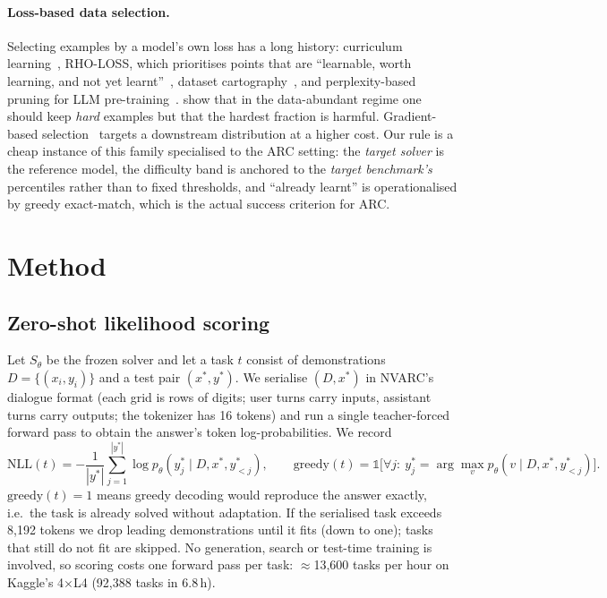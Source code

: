 \documentclass[11pt]{article}
\newcommand{\nvarc}{NVARC}
\begin{document}
\paragraph{Loss-based data selection.}
Selecting examples by a model's own loss has a long history: curriculum learning~\citep{bengio2009curriculum}, RHO-LOSS, which prioritises points that are ``learnable, worth learning, and not yet learnt''~\citep{mindermann2022rholoss}, dataset cartography~\citep{swayamdipta2020cartography}, and perplexity-based pruning for LLM pre-training~\citep{marion2023lessismore,ankner2024perplexed}. \citet{sorscher2022beyond} show that in the data-abundant regime one should keep \emph{hard} examples but that the hardest fraction is harmful. Gradient-based selection~\citep{xia2024less} targets a downstream distribution at a higher cost. Our rule is a cheap instance of this family specialised to the ARC setting: the \emph{target solver} is the reference model, the difficulty band is anchored to the \emph{target benchmark's} percentiles rather than to fixed thresholds, and ``already learnt'' is operationalised by greedy exact-match, which is the actual success criterion for ARC.

\section{Method}
\label{sec:method}

\subsection{Zero-shot likelihood scoring}
Let $S_\theta$ be the frozen solver and let a task $t$ consist of demonstrations $D=\{(x_i,y_i)\}$ and a test pair $(x^\ast,y^\ast)$. We serialise $(D,x^\ast)$ in \nvarc{}'s dialogue format (each grid is rows of digits; user turns carry inputs, assistant turns carry outputs; the tokenizer has 16 tokens) and run a single teacher-forced forward pass to obtain the answer's token log-probabilities. We record
\begin{equation}
\mathrm{NLL}(t)=-\frac{1}{|y^\ast|}\sum_{j=1}^{|y^\ast|}\log p_\theta\!\left(y^\ast_j \mid D,x^\ast,y^\ast_{<j}\right),\qquad
\mathrm{greedy}(t)=\mathbb{1}\Big[\forall j:\ y^\ast_j=\arg\max_v p_\theta(v\mid D,x^\ast,y^\ast_{<j})\Big].
\end{equation}
$\mathrm{greedy}(t)=1$ means greedy decoding would reproduce the answer exactly, i.e.\ the task is already solved without adaptation. If the serialised task exceeds 8{,}192 tokens we drop leading demonstrations until it fits (down to one); tasks that still do not fit are skipped. No generation, search or test-time training is involved, so scoring costs one forward pass per task: $\approx$13{,}600 tasks per hour on Kaggle's 4$\times$L4 (92{,}388 tasks in 6.8\,h).
\end{document}
